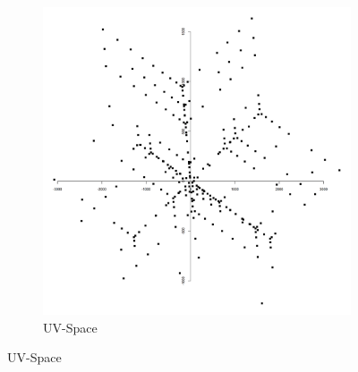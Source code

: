 \begin{figure}[h!]
\begin{subfigure}[b]{0.28\linewidth}
		\includegraphics[width=\linewidth, trim={18px 19px 18px 18px}, clip]{./chapters/01.intro/img/uv.png}
		\caption{UV-Space}
	\end{subfigure}


\end{figure}
